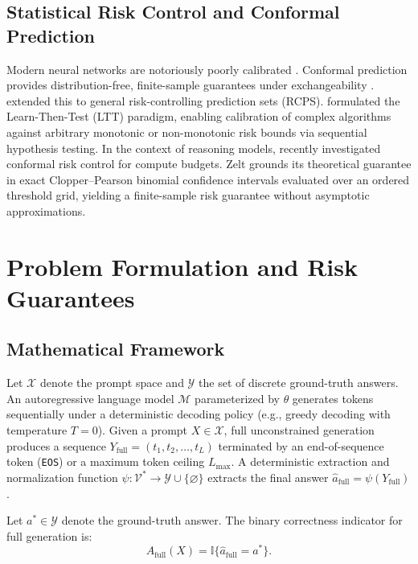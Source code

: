 \documentclass[11pt]{article}
\newcommand{\I}{\mathbb{I}}
\newcommand{\calX}{\mathcal{X}}
\newcommand{\calY}{\mathcal{Y}}
\begin{document}
\subsection{Statistical Risk Control and Conformal Prediction}
Modern neural networks are notoriously poorly calibrated \citep{guo2017calibration}. Conformal prediction provides distribution-free, finite-sample guarantees under exchangeability \citep{vovk2005algorithmic,angelopoulos2023conformal}. \citet{bates2021rcps} extended this to general risk-controlling prediction sets (RCPS). \citet{angelopoulos2021learntest} formulated the Learn-Then-Test (LTT) paradigm, enabling calibration of complex algorithms against arbitrary monotonic or non-monotonic risk bounds via sequential hypothesis testing. In the context of reasoning models, \citet{wang2026conformalthinking} recently investigated conformal risk control for compute budgets. Zelt grounds its theoretical guarantee in exact Clopper--Pearson binomial confidence intervals \citep{clopper1934use} evaluated over an ordered threshold grid, yielding a finite-sample risk guarantee without asymptotic approximations.

\section{Problem Formulation and Risk Guarantees}
\label{sec:formulation}

\subsection{Mathematical Framework}
Let $\calX$ denote the prompt space and $\calY$ the set of discrete ground-truth answers. An autoregressive language model $\mathcal{M}$ parameterized by $\theta$ generates tokens sequentially under a deterministic decoding policy (e.g., greedy decoding with temperature $T=0$). Given a prompt $X \in \calX$, full unconstrained generation produces a sequence $Y_{\mathrm{full}} = (t_1, t_2, \dots, t_L)$ terminated by an end-of-sequence token (\texttt{EOS}) or a maximum token ceiling $L_{\max}$. A deterministic extraction and normalization function $\psi: \mathcal{V}^* \to \calY \cup \{\varnothing\}$ extracts the final answer $\hat{a}_{\mathrm{full}} = \psi(Y_{\mathrm{full}})$.

Let $a^* \in \calY$ denote the ground-truth answer. The binary correctness indicator for full generation is:
\begin{equation}
  A_{\mathrm{full}}(X) = \I\{\hat{a}_{\mathrm{full}} = a^*\}.
\end{equation}
\end{document}
